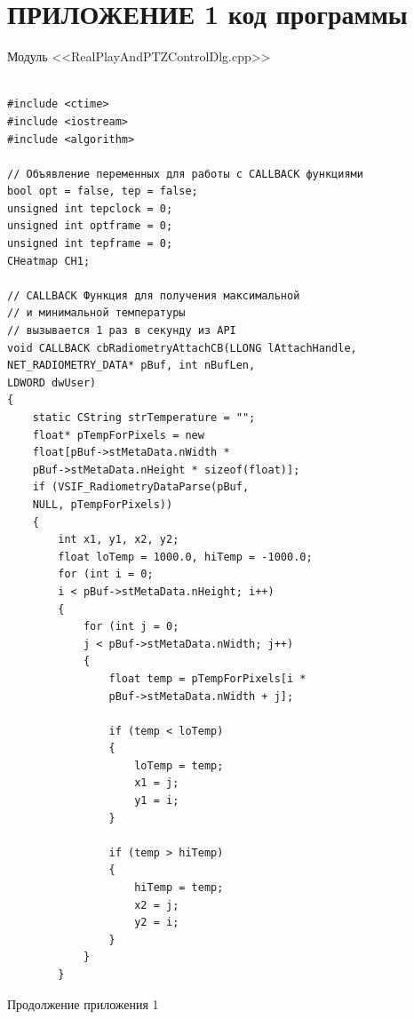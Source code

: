 \documentclass[14pt, a4paper]{extreport}
\begin{document}
\chapter*{ПРИЛОЖЕНИЕ 1 код программы}
\begin{center} {Модуль <<RealPlayAndPTZControlDlg.cpp>>}
\end{center}
\begin{Verbatim}[fontseries=c, fontsize=\fontsize{10pt}{12pt}\selectfont]

#include <ctime>
#include <iostream>
#include <algorithm>

// Объявление переменных для работы с CALLBACK функциями
bool opt = false, tep = false;
unsigned int tepclock = 0;
unsigned int optframe = 0;
unsigned int tepframe = 0;
CHeatmap CH1;

// CALLBACK Функция для получения максимальной 
// и минимальной температуры
// вызывается 1 раз в секунду из API
void CALLBACK cbRadiometryAttachCB(LLONG lAttachHandle, 
NET_RADIOMETRY_DATA* pBuf, int nBufLen, 
LDWORD dwUser)
{
	static CString strTemperature = "";
	float* pTempForPixels = new 
	float[pBuf->stMetaData.nWidth * 
	pBuf->stMetaData.nHeight * sizeof(float)];
	if (VSIF_RadiometryDataParse(pBuf, 
	NULL, pTempForPixels))
	{
		int x1, y1, x2, y2;
		float loTemp = 1000.0, hiTemp = -1000.0;
		for (int i = 0; 
		i < pBuf->stMetaData.nHeight; i++)
		{
			for (int j = 0; 
			j < pBuf->stMetaData.nWidth; j++)
			{
				float temp = pTempForPixels[i * 
				pBuf->stMetaData.nWidth + j];
				
				if (temp < loTemp)
				{
					loTemp = temp;
					x1 = j;
					y1 = i;
				}
				
				if (temp > hiTemp)
				{
					hiTemp = temp;
					x2 = j;
					y2 = i;
				}
			}
		}
\end{Verbatim}
\noindent Продолжение приложения 1
\end{document}
